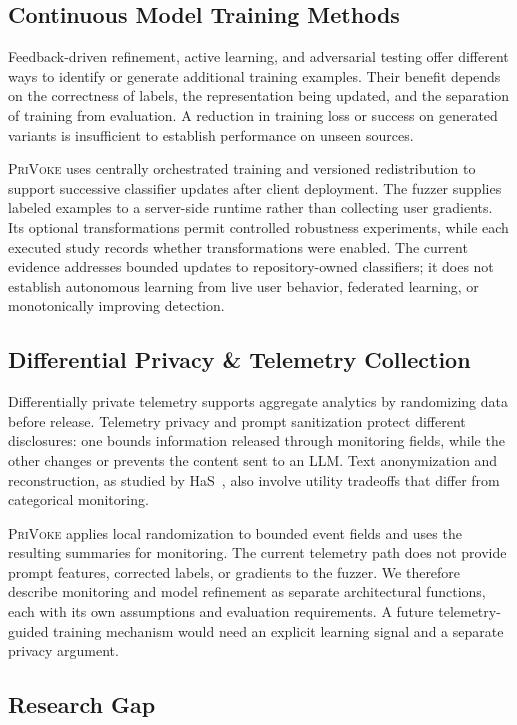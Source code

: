 \documentclass[conference]{IEEEtran}
\newcommand{\privoke}{\textsc{PriVoke}\xspace}
\begin{document}
\subsection{Continuous Model Training Methods}

Feedback-driven refinement, active learning, and adversarial testing offer different ways to identify or generate additional training examples. Their benefit depends on the correctness of labels, the representation being updated, and the separation of training from evaluation. A reduction in training loss or success on generated variants is insufficient to establish performance on unseen sources.

\privoke uses centrally orchestrated training and versioned redistribution to support successive classifier updates after client deployment. The fuzzer supplies labeled examples to a server-side runtime rather than collecting user gradients. Its optional transformations permit controlled robustness experiments, while each executed study records whether transformations were enabled. The current evidence addresses bounded updates to repository-owned classifiers; it does not establish autonomous learning from live user behavior, federated learning, or monotonically improving detection.

\subsection{Differential Privacy \& Telemetry Collection}

Differentially private telemetry supports aggregate analytics by randomizing data before release. Telemetry privacy and prompt sanitization protect different disclosures: one bounds information released through monitoring fields, while the other changes or prevents the content sent to an LLM. Text anonymization and reconstruction, as studied by HaS~\cite{HaS2024}, also involve utility tradeoffs that differ from categorical monitoring.

\privoke applies local randomization to bounded event fields and uses the resulting summaries for monitoring. The current telemetry path does not provide prompt features, corrected labels, or gradients to the fuzzer. We therefore describe monitoring and model refinement as separate architectural functions, each with its own assumptions and evaluation requirements. A future telemetry-guided training mechanism would need an explicit learning signal and a separate privacy argument.

\subsection{Research Gap}
\end{document}
